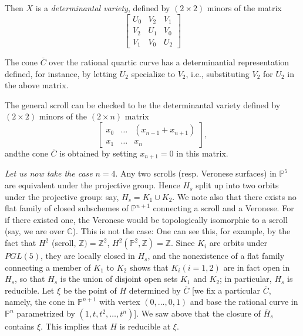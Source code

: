 {\begin{remark}
Then $X$ is a {\em determinantal variety}, defined by $(2\times 2)$
minors of the matrix
$$
\begin{bmatrix}
U_{0} & V_{2} & V_{1}\\
V_{2} & U_{1} & V_{0}\\
V_{1} & V_{0} & U_{2}
\end{bmatrix}
$$

The cone $\overline{C}$ over the rational quartic curve has a
determinantial representation defined, for instance, by letting
$U_{2}$ specialize to $V_{2}$, i.e., substituting $V_{2}$ for $U_{2}$
in the above matrix.
\end{remark}

\begin{remark}\label{part1-rem13.3}
The general scroll can be checked to be the determinantal variety
defined by $(2\times 2)$ minors of the $(2\times n)$ matrix
$$
\begin{bmatrix}
x_{0} & \ldots & (x_{n-1}+x_{n+1})\\
x_{1} & \ldots & x_{n}
\end{bmatrix},
$$
and\pageoriginale the cone $\overline{C}$ is obtained by setting
$x_{n+1}=0$ in this matrix.
\end{remark}

{\em Let us now take the case} $n=4$. Any two scrolls (resp.\@
Veronese surfaces) in $\mathbb{P}^{5}$ are equivalent under the
projective group. Hence $H_{s}$ split up into two orbits under the
projective group: say, $H_{s}=K_{1}\cup K_{2}$. We note also that
there exists no flat family of closed subschemes of $\mathbb{P}^{n+1}$
connecting a scroll and a Veronese. For if there existed one, the
Veronese would be topologically isomorphic to a scroll (say, we are
over $\mathbb{C}$). This is not the case: One can see this, for
example, by the fact that $H^{2}$ (scroll,
$\mathbb{Z})=\mathbb{Z}^{2}$,
$H^{2}(\mathbb{P}^{2},\mathbb{Z})=\mathbb{Z}$. Since $K_{i}$ are
orbits under $PGL(5)$, they are locally closed in $H_{s}$, and the
nonexistence of a flat family connecting a member of $K_{1}$ to
$K_{2}$ shows that $K_{i}(i=1,2)$ are in fact open in $H_{s}$, so that
$H_{s}$ is the union of disjoint open sets $K_{1}$ and $K_{2}$; in
particular, $H_{s}$ is reducible. Let $\xi$ be the point of $H$
determined by $\overline{C}$ [we fix a particular $\overline{C}$,
  namely, the cone in $\mathbb{P}^{n+1}$ with vertex $(0,\ldots,0,1)$
  and base the rational curve in $\mathbb{P}^{n}$ parametrized by
  $(1,t,t^{2},\ldots,t^{n})$]. We saw above that the closure of
$\overline{H}_{s}$ contains $\xi$. This implies that $H$ is reducible
at $\xi$.

}
